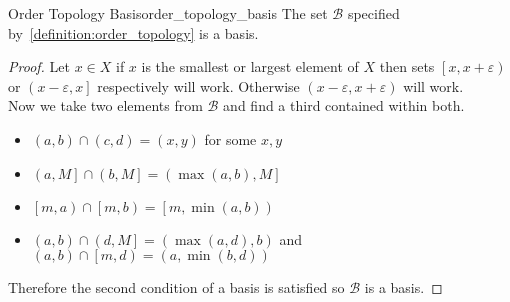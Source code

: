 \begin{proposition}
{Order Topology Basis}{order_topology_basis}
The set \(\mathcal{B} \) specified by~\ref{definition:order_topology} is a
basis.
\end{proposition}
\begin{proof}
Let \(x \in X \) if \(x \) is the smallest or largest element of \(X \) then
sets \(\left[ x, x + \varepsilon\right) \) or \(\left(x - \varepsilon,
x \right] \) respectively will work. Otherwise \(\left(x - \varepsilon, x
+ \varepsilon\right) \) will work.\\
Now we take two elements from \(\mathcal{B} \) and find a third contained
within both.
\begin{itemize}
    \item \(\left(a, b\right) \cap \left(c, d\right) = \left(x, y\right)
    \) for some \(x, y \)
    \item \(\left(a, M \right] \cap \left(b, M \right] = \left(\max\left(a, b\right),M \right] \)
    \item \(\left[m, a\right) \cap \left[m, b\right) = \left[m, \min\left(
    a, b\right)\right) \)
    \item \(\left(a, b\right) \cap \left(d, M \right] = \left(\max\left(a, d\right), b\right) \) and \(\left(a, b\right) \cap \left[ m, d
\right) = \left(a, \min\left(b, d\right)\right) \)
\end{itemize}
Therefore the second condition of a basis is satisfied so \(\mathcal{B} \)
is a basis.
\end{proof}
